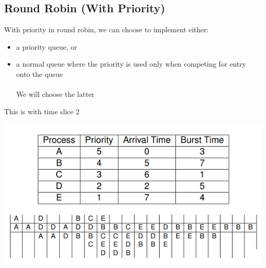 \documentclass{article}[18pt]
\begin{document}
\subsection{Round Robin (With Priority)}
With priority in round robin, we can choose to implement either:
\begin{itemize}
\item a priority queue, or
\item a normal queue where the priority is used only when competing for entry onto the queue\\
\\
We will choose the latter
\end{itemize}
This is with time slice 2
\begin{center}
\includegraphics[scale=0.7]{RRP}
\end{center}
\end{document}
